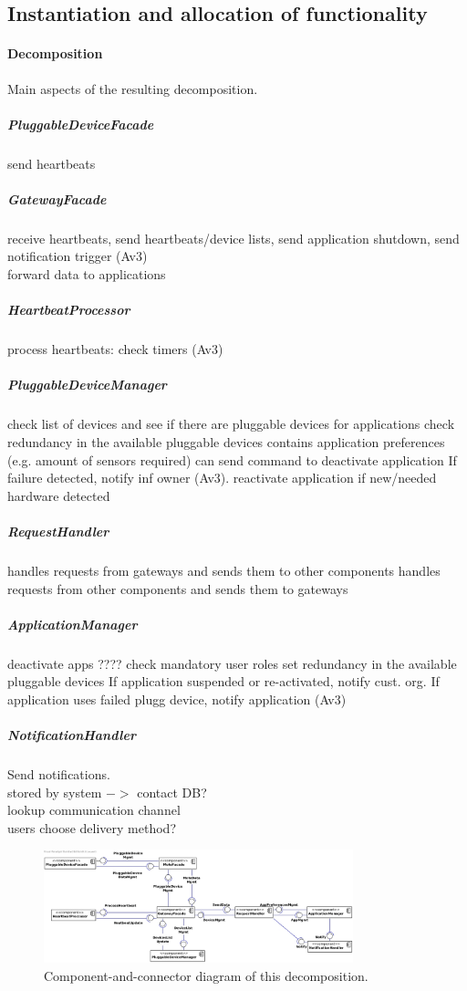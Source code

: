 \subsection{Instantiation and allocation of functionality}
    \paragraph{Decomposition}
    Main aspects of the resulting decomposition.

    \subparagraph{PluggableDeviceFacade}
    send heartbeats

    \subparagraph{GatewayFacade}
    receive heartbeats, send heartbeats/device lists, send application shutdown, send notification trigger (Av3)\\
    forward data to applications

    \subparagraph{HeartbeatProcessor}
    process heartbeats: check timers (Av3)

    \subparagraph{PluggableDeviceManager}
    check list of devices and see if there are pluggable devices for applications
    check redundancy in the available pluggable devices
    contains application preferences (e.g. amount of sensors required)
    can send command to deactivate application
    If failure detected, notify inf owner (Av3).
    reactivate application if new/needed hardware detected

    \subparagraph{RequestHandler}
    handles requests from gateways and sends them to other components
    handles requests from other components and sends them to gateways

    \subparagraph{ApplicationManager}
    deactivate apps
    ???? check mandatory user roles
    set redundancy in the available pluggable devices
    If application suspended or re-activated, notify cust. org.
    If application uses failed plugg device, notify application
    (Av3)

    \subparagraph{NotificationHandler}
    Send notifications. \\
    stored by system \(->\) contact DB? \\
    lookup communication channel \\
    users choose delivery method?

    \begin{figure}[!htp]
    	\centering
    	\includegraphics[width=0.8\textwidth]{component-diagram-1}
    	\caption{Component-and-connector diagram of this decomposition.}
        \label{fig:it1-cc_main}
    \end{figure}

